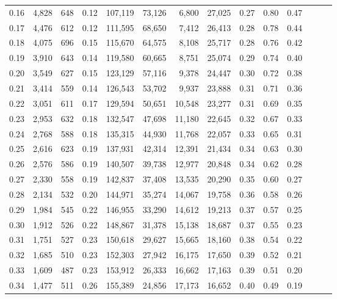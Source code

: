 \begin{tabular}{rrrrrrrrrrrrrr}
0.16 &   4,828 &  648 &  0.12 &  107,119 &   73,126 &   6,800 &  27,025 &  0.27 &  0.80 &      0.47 \\
0.17 &   4,476 &  612 &  0.12 &  111,595 &   68,650 &   7,412 &  26,413 &  0.28 &  0.78 &      0.44 \\
0.18 &   4,075 &  696 &  0.15 &  115,670 &   64,575 &   8,108 &  25,717 &  0.28 &  0.76 &      0.42 \\
0.19 &   3,910 &  643 &  0.14 &  119,580 &   60,665 &   8,751 &  25,074 &  0.29 &  0.74 &      0.40 \\
0.20 &   3,549 &  627 &  0.15 &  123,129 &   57,116 &   9,378 &  24,447 &  0.30 &  0.72 &      0.38 \\
0.21 &   3,414 &  559 &  0.14 &  126,543 &   53,702 &   9,937 &  23,888 &  0.31 &  0.71 &      0.36 \\
0.22 &   3,051 &  611 &  0.17 &  129,594 &   50,651 &  10,548 &  23,277 &  0.31 &  0.69 &      0.35 \\
0.23 &   2,953 &  632 &  0.18 &  132,547 &   47,698 &  11,180 &  22,645 &  0.32 &  0.67 &      0.33 \\
0.24 &   2,768 &  588 &  0.18 &  135,315 &   44,930 &  11,768 &  22,057 &  0.33 &  0.65 &      0.31 \\
0.25 &   2,616 &  623 &  0.19 &  137,931 &   42,314 &  12,391 &  21,434 &  0.34 &  0.63 &      0.30 \\
0.26 &   2,576 &  586 &  0.19 &  140,507 &   39,738 &  12,977 &  20,848 &  0.34 &  0.62 &      0.28 \\
0.27 &   2,330 &  558 &  0.19 &  142,837 &   37,408 &  13,535 &  20,290 &  0.35 &  0.60 &      0.27 \\
0.28 &   2,134 &  532 &  0.20 &  144,971 &   35,274 &  14,067 &  19,758 &  0.36 &  0.58 &      0.26 \\
0.29 &   1,984 &  545 &  0.22 &  146,955 &   33,290 &  14,612 &  19,213 &  0.37 &  0.57 &      0.25 \\
0.30 &   1,912 &  526 &  0.22 &  148,867 &   31,378 &  15,138 &  18,687 &  0.37 &  0.55 &      0.23 \\
0.31 &   1,751 &  527 &  0.23 &  150,618 &   29,627 &  15,665 &  18,160 &  0.38 &  0.54 &      0.22 \\
0.32 &   1,685 &  510 &  0.23 &  152,303 &   27,942 &  16,175 &  17,650 &  0.39 &  0.52 &      0.21 \\
0.33 &   1,609 &  487 &  0.23 &  153,912 &   26,333 &  16,662 &  17,163 &  0.39 &  0.51 &      0.20 \\
0.34 &   1,477 &  511 &  0.26 &  155,389 &   24,856 &  17,173 &  16,652 &  0.40 &  0.49 &      0.19 \\

\end{tabular}
